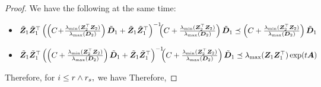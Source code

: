 \begin{proof}
{}
We have the following at the same time:
\begin{itemize}[leftmargin=*]
\item $  \tilde{\boldsymbol{Z}}_1  \tilde{\boldsymbol{Z}}_1^\top     \left(   \left(C \! + \!   \tfrac{\lambda_{\mathrm{min}}(\boldsymbol{Z}_2^\top \boldsymbol{Z}_2)}{\lambda_{\mathrm{max}}(\boldsymbol{D}_2)} \right) \tilde{\boldsymbol{D}}_1  +   \tilde{\boldsymbol{Z}}_1  \tilde{\boldsymbol{Z}}_1^\top \right)^{-1}  \!\!\!   \left(C +   \tfrac{\lambda_{\mathrm{min}}(\boldsymbol{Z}_2^\top \boldsymbol{Z}_2)}{\lambda_{\mathrm{max}}(\boldsymbol{D}_2)} \right) \tilde{\boldsymbol{D}}_1    \preceq   \left(C +   \tfrac{\lambda_{\mathrm{min}}(\boldsymbol{Z}_2^\top \boldsymbol{Z}_2)}{\lambda_{\mathrm{max}}(\boldsymbol{D}_2)} \right) \tilde{\boldsymbol{D}}_1   $  
\item    $ \tilde{\boldsymbol{Z}}_1  \tilde{\boldsymbol{Z}}_1^\top     \left(   \left(C +   \tfrac{\lambda_{\mathrm{min}}(\boldsymbol{Z}_2^\top \boldsymbol{Z}_2)}{\lambda_{\mathrm{max}}(\boldsymbol{D}_2)} \right) \tilde{\boldsymbol{D}}_1  +   \tilde{\boldsymbol{Z}}_1  \tilde{\boldsymbol{Z}}_1^\top \right)^{-1}  \!\!\! \left(C +   \tfrac{\lambda_{\mathrm{min}}(\boldsymbol{Z}_2^\top \boldsymbol{Z}_2)}{\lambda_{\mathrm{max}}(\boldsymbol{D}_2)} \right) \tilde{\boldsymbol{D}}_1    \preceq       \lambda_{\mathrm{max}}( \boldsymbol{Z}_1 \boldsymbol{Z}_1^\top ) \exp(t \boldsymbol{A} )$
\end{itemize}
Therefore,  for $i \leq r \wedge r_s,$ we have
Therefore,
\end{proof}

